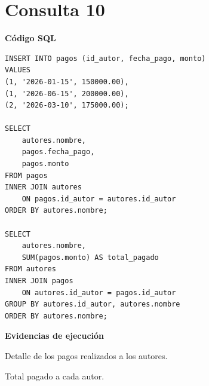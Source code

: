 
\clearpage
\section*{Consulta 10}

\textbf{Código SQL}

\begin{lstlisting}
INSERT INTO pagos (id_autor, fecha_pago, monto)
VALUES
(1, '2026-01-15', 150000.00),
(1, '2026-06-15', 200000.00),
(2, '2026-03-10', 175000.00);

SELECT
    autores.nombre,
    pagos.fecha_pago,
    pagos.monto
FROM pagos
INNER JOIN autores
    ON pagos.id_autor = autores.id_autor
ORDER BY autores.nombre;

SELECT
    autores.nombre,
    SUM(pagos.monto) AS total_pagado
FROM autores
INNER JOIN pagos
    ON autores.id_autor = pagos.id_autor
GROUP BY autores.id_autor, autores.nombre
ORDER BY autores.nombre;
\end{lstlisting}

\textbf{Evidencias de ejecución}


{Detalle de los pagos realizados a los autores.}

{Total pagado a cada autor.}



